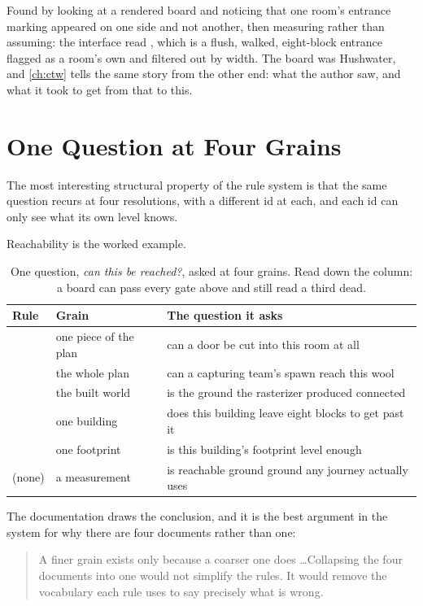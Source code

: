 Found by looking at a rendered board and noticing that one room's entrance marking
appeared on one side and not another, then measuring rather than assuming: the
interface read ,
which is a flush, walked, eight-block entrance flagged as a room's own and filtered
out by width. The board was Hushwater, and \cref{ch:ctw} tells the same story from
the other end: what the author saw, and what it took to get from that to this.

\section{One Question at Four Grains}

The most interesting structural property of the rule system is that the same
question recurs at four resolutions, with a different id at each, and each id can
only see what its own level knows.

Reachability is the worked example.

\begin{table}[htbp]
\caption{One question, \emph{can this be reached?}, asked at four grains. Read
down the column: a board can pass every gate above and still read a third dead.}
\label{tab:one-question}
\small
\begin{tabularx}{\textwidth}{l L{3.6cm} Y}
\toprule
\textbf{Rule} & \textbf{Grain} & \textbf{The question it asks} \\
\midrule
{} & one piece of the plan & can a door be cut into this room at all \\
 & the whole plan & can a capturing team's spawn reach this wool \\
 & the built world & is the ground the rasterizer produced connected \\
 & one building & does this building leave eight blocks to get past it \\
 & one footprint & is this building's footprint level enough \\
(none) & a measurement & is reachable ground ground any journey actually uses \\
\bottomrule
\end{tabularx}
\end{table}

The documentation draws the conclusion, and it is the best argument in the system
for why there are four documents rather than one:

\begin{quote}
A finer grain exists only because a coarser one does \ldots Collapsing the four
documents into one would not simplify the rules. It would remove the vocabulary
each rule uses to say precisely what is wrong.
\end{quote}

